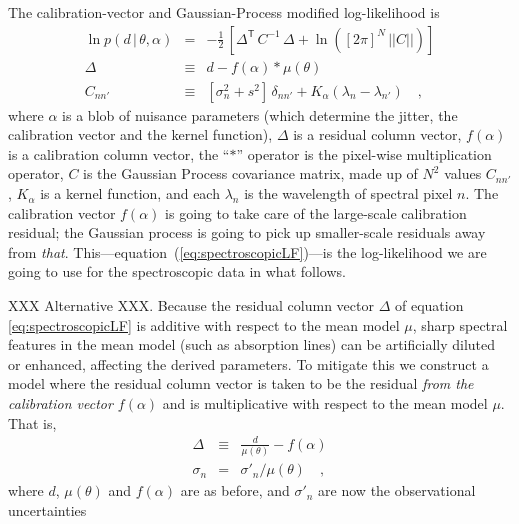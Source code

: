 \documentclass[iop,numberedappendix]{emulateapj}
\newcommand{\transpose}[1]{{#1}^{\!\mathsf T}}
\newcommand{\given}{\,|\,}
\renewcommand{\det}[1]{||{#1}||}
\begin{document}
The calibration-vector and Gaussian-Process modified log-likelihood is
\begin{eqnarray}\label{eq:spectroscopicLF}
\ln p(d\given\theta,\alpha) &=& -\frac{1}{2}\,\left[\transpose{\Delta}\,C^{-1}\,\Delta + \ln([2\pi]^N\,\det{C}) \right]
\\
\Delta &\equiv& d - f(\alpha)\ast\mu(\theta)
\\
C_{nn'} &\equiv& [\sigma_n^2 + s^2]\,\delta_{nn'} + K_\alpha(\lambda_n - \lambda_{n'})
\quad ,
\end{eqnarray}
where $\alpha$ is a blob of nuisance parameters
(which determine the jitter, the calibration vector and the kernel function),
$\Delta$ is a residual column vector,
$f(\alpha)$ is a calibration column vector,
the ``$\ast$'' operator is the pixel-wise multiplication operator,
$C$ is the Gaussian Process covariance matrix,
made up of $N^2$ values $C_{nn'}$,
$K_\alpha$ is a kernel function,
and each $\lambda_n$ is the wavelength of spectral pixel $n$.
The calibration vector $f(\alpha)$ is going to take care of the
large-scale calibration residual; the Gaussian process is going to
pick up smaller-scale residuals away from \emph{that}.
This---equation~(\ref{eq:spectroscopicLF})---is the log-likelihood we
are going to use for the spectroscopic data in what follows.


XXX Alternative XXX.
Because the residual column vector $\Delta$ of equation
\ref{eq:spectroscopicLF} is additive with respect to the mean model
$\mu$, sharp spectral features in the mean model (such as absorption
lines) can be artificially
diluted or enhanced, affecting the derived parameters. To mitigate this we construct a
model where the residual column vector is taken to be the residual
\emph{from the calibration vector $f(\alpha)$} and is multiplicative
with respect to the mean model $\mu$.  That is,
\begin{eqnarray}\label{eq:spectroscopicLFalt} \Delta &\equiv&
\frac{d}{\mu(\theta)} - f(\alpha) \\
\sigma_{n} & = & \sigma'_n / \mu(\theta)
\quad ,
\end{eqnarray}
where $d$, $\mu(\theta)$ and $f(\alpha)$ are as before, and
$\sigma'_{n}$ are now the observational uncertainties
\end{document}
